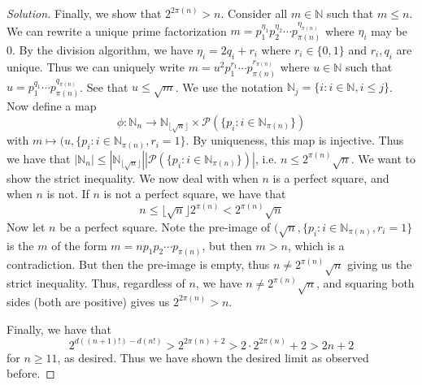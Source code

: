 \documentclass{article}
\newcommand{\N}{{\mathbb N}}
\begin{document}
\begin{proof}[Solution]
	Finally, we show that $2^{2\pi(n)} > n$.
	Consider all $m \in \N$ such that $m \leq n$.
	We can rewrite a unique prime factorization
	$m = p_1^{\eta_1}p_2^{\eta_2}\cdots p_{\pi(n)}^{\eta_{\pi(n)}}$
	where $\eta_i$ may be $0$.
	By the division algorithm, we have $\eta_i = 2q_i + r_i$
	where $r_i \in \{0,1\}$ and $r_i,q_i$ are unique.
	Thus we can uniquely write $m = u^2p_1^{r_1}\cdots p_{\pi(n)}^{r_{\pi(n)}}$
	where $u \in \N$ such that $u = p_1^{q_1}\cdots p_{\pi(n)}^{q_{\pi(n)}}$.
	See that $u \leq \sqrt{m}$.
	We use the notation $\N_j = \{i \colon i \in \N, i \leq j\}$.
	Now define a map
	\[
		\phi \colon \N_n \to \N_{\lfloor \sqrt{n}\rfloor}
		\times \mathcal{P}(\{p_i \colon i \in \N_{\pi(n)}\})
	\]
	with $m \mapsto (u, \{p_i \colon i\in \N_{\pi(n)}, r_i = 1\}$.
	By uniqueness, this map is injective.
	Thus we have that $|\N_n| \leq |\N_{\lfloor \sqrt{n}\rfloor}|
	|\mathcal{P}(\{p_i \colon i \in \N_{\pi(n)}\})|$,
	i.e. $n \leq 2^{\pi(n)}\sqrt{n}$.
	We want to show the strict inequality.
	We now deal with when $n$ is a perfect square, and when $n$ is not.
	If $n$ is not a perfect square, we have that
	\[
		n \leq \lfloor \sqrt{n} \rfloor 2^{\pi(n)} < 2^{\pi(n)}\sqrt{n}
	\]
	Now let $n$ be a perfect square.
	Note the pre-image of $(\sqrt{n},\{p_i \colon i \in \N_{\pi(n)}, r_i=1\}$
	is the $m$ of the form $m = np_1p_2 \cdots p_{\pi(n)}$,
	but then $m > n$, which is a contradiction.
	But then the pre-image is empty,
	thus $n \neq 2^{\pi(n)}\sqrt{n}$ giving us the strict inequality.
	Thus, regardless of $n$, we have $n \neq 2^{\pi(n)}\sqrt{n}$,
	and squaring both sides (both are positive)
	gives us $2^{2\pi(n)} > n$.

	Finally, we have that
	\[
		2^{d((n+1)!) - d(n!)} > 2^{2\pi(n)+2} > 2\cdot 2^{2\pi(n)}+2
		> 2n+2
	\]
	for $n \geq 11$, as desired.
	Thus we have shown the desired limit as observed before.
\end{proof}
\end{document}
